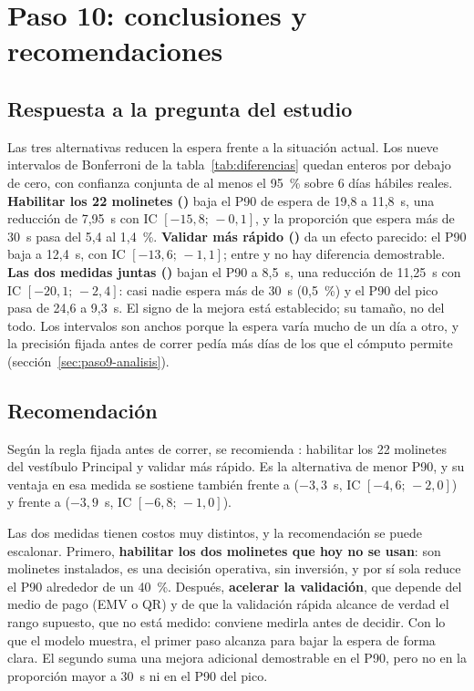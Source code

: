 \section{Paso 10: conclusiones y recomendaciones}
\label{sec:paso10-conclusiones}

\subsection{Respuesta a la pregunta del estudio}

Las tres alternativas reducen la espera frente a la situación actual. Los nueve intervalos de Bonferroni de la
tabla~\ref{tab:diferencias} quedan enteros por debajo de cero, con confianza conjunta de al menos el 95~\%
sobre 6 días hábiles reales. \textbf{Habilitar los 22 molinetes (\EI{})} baja el P90 de espera de 19,8 a
11,8~s, una reducción de 7,95~s con IC $[-15{,}8;\,-0{,}1]$, y la proporción que espera más de 30~s pasa del
5,4 al 1,4~\%. \textbf{Validar más rápido (\ET{})} da un efecto parecido: el P90 baja a 12,4~s, con IC
$[-13{,}6;\,-1{,}1]$; entre \EI{} y \ET{} no hay diferencia demostrable. \textbf{Las dos medidas juntas
(\EIT{})} bajan el P90 a 8,5~s, una reducción de 11,25~s con IC $[-20{,}1;\,-2{,}4]$: casi nadie espera más de
30~s (0,5~\%) y el P90 del pico pasa de 24,6 a 9,3~s. El signo de la mejora está establecido; su tamaño, no del todo. Los intervalos son anchos porque la espera
varía mucho de un día a otro, y la precisión fijada antes de correr pedía más días de los que el cómputo
permite (sección~\ref{sec:paso9-analisis}).

\subsection{Recomendación}

Según la regla fijada antes de correr, se recomienda \textbf{\EIT{}}: habilitar los 22 molinetes del vestíbulo
Principal y validar más rápido. Es la alternativa de menor P90, y su ventaja en esa medida se sostiene también
frente a \EI{} ($-3{,}3$~s, IC $[-4{,}6;\,-2{,}0]$) y frente a \ET{} ($-3{,}9$~s, IC $[-6{,}8;\,-1{,}0]$).

Las dos medidas tienen costos muy distintos, y la recomendación se puede escalonar. Primero,
\textbf{habilitar los dos molinetes que hoy no se usan}: son molinetes instalados, es una decisión operativa,
sin inversión, y por sí sola reduce el P90 alrededor de un 40~\%. Después, \textbf{acelerar la validación}, que
depende del medio de pago (EMV o QR) y de que la validación rápida alcance de verdad el rango supuesto, que no
está medido: conviene medirla antes de decidir. Con lo que el modelo muestra, el primer paso alcanza para bajar la espera de forma clara. El segundo suma una
mejora adicional demostrable en el P90, pero no en la proporción mayor a 30~s ni en el P90 del pico.

